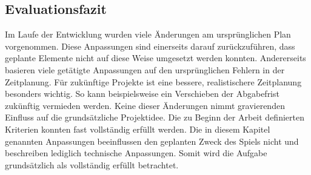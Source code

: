 \subsection{Evaluationsfazit}
Im Laufe der Entwicklung wurden viele Änderungen am ursprünglichen Plan vorgenommen. Diese Anpassungen sind einerseits darauf zurückzuführen, dass geplante Elemente nicht auf diese Weise umgesetzt werden konnten. Andererseits basieren viele getätigte Anpassungen auf den ursprünglichen Fehlern in der Zeitplanung. Für zukünftige Projekte ist eine bessere, realistischere Zeitplanung besonders wichtig. So kann beispielsweise ein Verschieben der Abgabefrist zukünftig vermieden werden.
Keine dieser Änderungen nimmt gravierenden Einfluss auf die grundsätzliche Projektidee. Die zu Beginn der Arbeit definierten Kriterien konnten fast vollständig erfüllt werden. Die in diesem Kapitel genannten Anpassungen beeinflussen den geplanten Zweck des Spiels nicht und beschreiben lediglich technische Anpassungen. Somit wird die Aufgabe grundsätzlich als vollständig erfüllt betrachtet.


